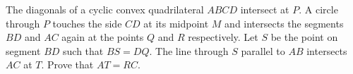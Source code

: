 The diagonals of a cyclic convex quadrilateral $ABCD$ intersect at $P$. A circle through $P$ touches the side $CD$ at its midpoint $M$ and intersects the segments $BD$ and $AC$ again at the points $Q$ and $R$ respectively. Let $S$ be the point on segment $BD$ such that $BS = DQ$. The line through $S$ parallel to $AB$ intersects $AC$ at $T$. Prove that $AT = RC$.